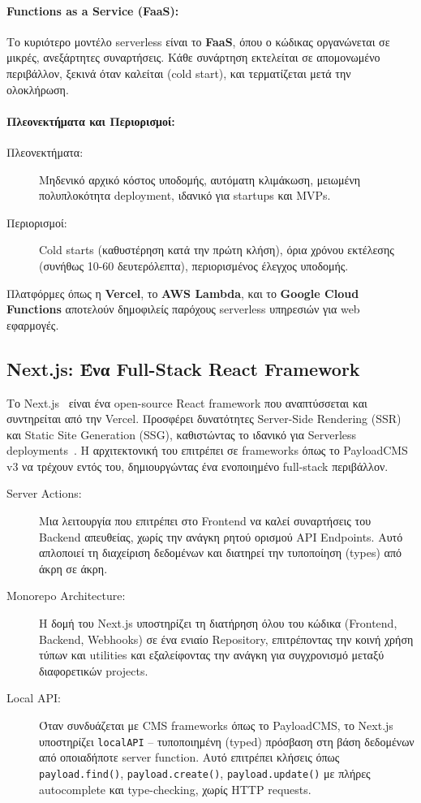\documentclass[
	12pt, %
	oneside, %
	greek,
	onehalfspacing, %
	liststotoc, %
	toctotoc, %
	parskip, %
	headsepline, %
]{MastersDoctoralThesis} %
\newcommand{\code}[1]{\texttt{#1}}
\begin{document}
\paragraph{Functions as a Service (FaaS):}
Το κυριότερο μοντέλο serverless είναι το \textbf{FaaS}, όπου ο κώδικας οργανώνεται σε μικρές, ανεξάρτητες συναρτήσεις. Κάθε συνάρτηση εκτελείται σε απομονωμένο περιβάλλον, ξεκινά όταν καλείται (cold start), και τερματίζεται μετά την ολοκλήρωση.

\paragraph{Πλεονεκτήματα και Περιορισμοί:}
\begin{description}
    \item[Πλεονεκτήματα:] Μηδενικό αρχικό κόστος υποδομής, αυτόματη κλιμάκωση, μειωμένη πολυπλοκότητα deployment, ιδανικό για startups και MVPs.
    \item[Περιορισμοί:] Cold starts (καθυστέρηση κατά την πρώτη κλήση), όρια χρόνου εκτέλεσης (συνήθως 10-60 δευτερόλεπτα), περιορισμένος έλεγχος υποδομής.
\end{description}

Πλατφόρμες όπως η \textbf{Vercel}, το \textbf{AWS Lambda}, και το \textbf{Google Cloud Functions} αποτελούν δημοφιλείς παρόχους serverless υπηρεσιών για web εφαρμογές.

\subsection{Next.js: Ένα Full-Stack React Framework}
\label{subsec:nextjs}

Το Next.js~\cite{nextjs} είναι ένα open-source React framework που αναπτύσσεται και συντηρείται από την Vercel. Προσφέρει δυνατότητες Server-Side Rendering (SSR) και Static Site Generation (SSG), καθιστώντας το ιδανικό για Serverless deployments~\cite{serverless}. Η αρχιτεκτονική του επιτρέπει σε frameworks όπως το PayloadCMS v3 να τρέχουν εντός του, δημιουργώντας ένα ενοποιημένο full-stack περιβάλλον.

\begin{description}
    \item[Server Actions:] Μια λειτουργία που επιτρέπει στο Frontend να καλεί συναρτήσεις του Backend απευθείας, χωρίς την ανάγκη ρητού ορισμού API Endpoints. Αυτό απλοποιεί τη διαχείριση δεδομένων και διατηρεί την τυποποίηση (types) από άκρη σε άκρη.
    \item[Monorepo Architecture:] Η δομή του Next.js υποστηρίζει τη διατήρηση όλου του κώδικα (Frontend, Backend, Webhooks) σε ένα ενιαίο Repository, επιτρέποντας την κοινή χρήση τύπων και utilities και εξαλείφοντας την ανάγκη για συγχρονισμό μεταξύ διαφορετικών projects.
    \item[Local API:] Όταν συνδυάζεται με CMS frameworks όπως το PayloadCMS, το Next.js υποστηρίζει \code{localAPI} -- τυποποιημένη (typed) πρόσβαση στη βάση δεδομένων από οποιαδήποτε server function. Αυτό επιτρέπει κλήσεις όπως \code{payload.find()}, \code{payload.create()}, \code{payload.update()} με πλήρες autocomplete και type-checking, χωρίς HTTP requests.
\end{description}
\end{document}
